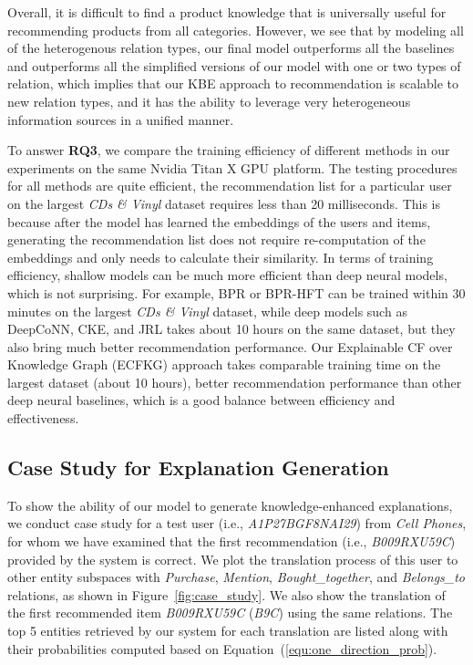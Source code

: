\documentclass[algorithms,article,accept,moreauthors,pdftex,10pt,a4paper]{Definitions/mdpi}
\begin{document}
Overall, it is difficult to find a product knowledge that is universally useful for recommending products from all categories.
However, we see that by modeling all of the heterogenous relation types, our final model outperforms all the baselines and outperforms all the simplified versions of our model with one or two types of relation, which implies that our KBE approach to recommendation is scalable to new relation types, and it has the ability to leverage very heterogeneous information sources in a unified manner.

To answer \textbf{RQ3}, we compare the training efficiency of different methods in our experiments on the same Nvidia Titan X GPU platform. The testing procedures for all methods are quite efficient,  the recommendation list for a particular user on the largest \textit{CDs \& Vinyl} dataset requires less than 20 milliseconds. This is because after the model has learned the embeddings of the users and items, generating the recommendation list does not require re-computation of the embeddings and only needs to calculate their similarity. In terms of training efficiency, shallow models can be much more efficient than deep neural models, which is not surprising. For example, BPR or BPR-HFT can be trained within 30 minutes on the largest \textit{CDs \& Vinyl} dataset, while deep models such as DeepCoNN, CKE, and JRL takes about 10 hours on the same dataset, but they also bring much better recommendation performance. Our Explainable CF over Knowledge Graph (ECFKG) approach takes comparable training time on the largest dataset (about 10 hours),  better recommendation performance than other deep neural baselines, which is a good balance between efficiency and effectiveness.










\subsection{Case Study for Explanation Generation}

To show the ability of our model to generate knowledge-enhanced explanations, we conduct case study for a test user (i.e., \textit{A1P27BGF8NAI29}) from \textit{Cell Phones}, for whom we have examined that the first recommendation (i.e., \textit{B009RXU59C}) provided by the system is correct.
We plot the translation process of this user to other entity subspaces with \textit{Purchase}, \textit{Mention}, \textit{Bought\_together}, and \textit{Belongs\_to} relations, as shown in Figure~\ref{fig:case_study}.
We also show the translation of the first recommended item \textit{B009RXU59C} (\textit{B9C}) using the same relations.
The top 5 entities retrieved by our system for each translation are listed along with their probabilities computed based on Equation~(\ref{equ:one_direction_prob}).
\end{document}
